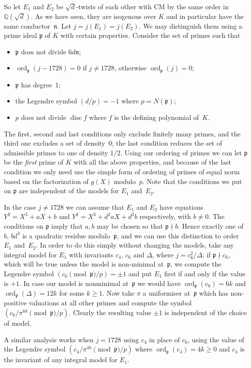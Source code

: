 \documentclass{article}
\def\Q{{\mathbb Q}}
\def\n{{\mathfrak n}}
\def\p{{\mathfrak p}}
\DeclareMathOperator{\disc}{disc}
\DeclareMathOperator{\ord}{ord}
\begin{document}
So let $E_1$ and $E_2$ be $\sqrt{d}$-twists of each other with CM by
the same order in $\Q(\sqrt{d})$.  As we have seen, they are isogenous
over $K$ and in particular have the same conductor~$\n$.  Let
$j=j(E_1)=j(E_2)$.  We may distinguish them using a prime ideal $\p$
of $K$ with certain properties.  Consider the set of primes such that
\begin{itemize}
\item $\p$ does not divide $6d\n$;
\item $\ord_{\p}(j-1728)=0$ if $j\not=1728$, otherwise
  $\ord_{\p}(j)=0$;
\item $\p$ has degree~$1$;
\item the Legendre symbol $(d/p)=-1$ where $p=N(\p)$;
\item $p$ does not divide $\disc f$ where $f$ is the defining polynomial
  of~$K$.
\end{itemize}
The first, second and last conditions only exclude finitely many
primes, and the third one excludes a set of density~$0$; the last
condition reduces the set of admissible primes to one of density
$1/2$.  Using our ordering of primes we can let $\p$ be the
\textit{first} prime of $K$ with all the above properties, and because
of the last condition we only need use the simple form of ordering of
primes of equal norm based on the factorization of $g(X)$ modulo~$p$.
Note that the conditions we put on $\p$ are independent of the models
for $E_1$ and~$E_2$.

In the case $j\not=1728$ we can assume that $E_1$ and $E_2$ have
equations $Y^2=X^3+aX+b$ and $Y^2=X^3+d^2aX+d^3b$ respectively, with
$b\not=0$.  The conditions on $\p$ imply that $a,b$ may be chosen so
that $\p\nmid b$.  Hence exactly one of $b$, $bd^3$ is a quadratic
residue modulo~$\p$, and we can use this distinction to order $E_1$
and~$E_2$.  In order to do this simply without changing the models,
take any integral model for $E_1$ with invariants $c_4$, $c_6$ and
$\Delta$, where $j=c_6^2/\Delta$; if $\p\nmid c_6$, which will be true
unless the model is non-minimal at~$\p$, we compute the Legendre
symbol $(c_6\pmod{\p}/p)=\pm1$ and put $E_1$ first if and only if the
value is $+1$.  In case our model is nonminimal at~$\p$ we would have
$\ord_{\p}(c_6)=6k$ and $\ord_{\p}(\Delta)=12k$ for some $k\ge1$.  Now
take $\pi$ a uniformiser at~$\p$ which has non-positive valuations at
all other primes and compute the symbol $(c_6/\pi^{6k}\pmod{\p}/p)$.
Clearly the resulting value $\pm1$ is independent of the choice of
model.

A similar analysis works when $j=1728$ using $c_4$ in place of $c_6$,
using the value of the Legendre symbol $(c_4/\pi^{4k}\pmod{\p}/p)$
where $\ord_{\p}(c_4)=4k\ge0$ and $c_4$ is the invariant of any
integral model for $E_1$.
\end{document}
